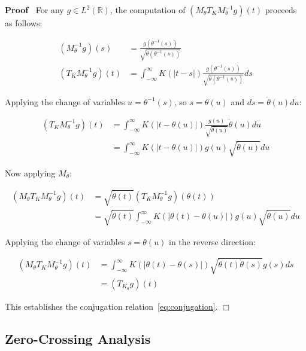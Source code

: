 \documentclass{article}
\newenvironment{proof}{\noindent\textbf{Proof\ }}{\hspace*{\fill}$\Box$\medskip}
\begin{document}
\begin{proof}
  For any $g \in L^2 (\mathbb{R})$, the computation of $(M_{\theta} T_K
  M_{\theta}^{- 1} g) (t)$ proceeds as follows:
  
  \begin{align}
    (M_{\theta}^{- 1} g) (s) & = \frac{g (\theta^{- 1}
    (s))}{\sqrt{\dot{\theta} (\theta^{- 1} (s))}} \\
    (T_K M_{\theta}^{- 1} g) (t) & = \int_{- \infty}^{\infty} K (|t - s|)
    \frac{g (\theta^{- 1} (s))}{\sqrt{\dot{\theta} (\theta^{- 1} (s))}} ds 
  \end{align}
  
  Applying the change of variables $u = \theta^{- 1} (s)$, so $s = \theta (u)$
  and $ds = \dot{\theta} (u) du$:
  
  \begin{align}
    (T_K M_{\theta}^{- 1} g) (t) & = \int_{- \infty}^{\infty} K (|t - \theta
    (u) |) \frac{g (u)}{\sqrt{\dot{\theta} (u)}}  \dot{\theta} (u) du \\
    & = \int_{- \infty}^{\infty} K (|t - \theta (u) |) g (u)
    \sqrt{\dot{\theta} (u)} du 
  \end{align}
  
  Now applying $M_{\theta}$:
  
  \begin{align}
    (M_{\theta} T_K M_{\theta}^{- 1} g) (t) & = \sqrt{\dot{\theta} (t)}  (T_K
    M_{\theta}^{- 1} g) (\theta (t)) \\
    & = \sqrt{\dot{\theta} (t)}  \int_{- \infty}^{\infty} K (| \theta (t) -
    \theta (u) |) g (u) \sqrt{\dot{\theta} (u)} du 
  \end{align}
  
  Applying the change of variables $s = \theta (u)$ in the reverse direction:
  
  \begin{align}
    (M_{\theta} T_K M_{\theta}^{- 1} g) (t) & = \int_{- \infty}^{\infty} K (|
    \theta (t) - \theta (s) |) \sqrt{\dot{\theta} (t)  \dot{\theta} (s)} g (s)
    ds \\
    & = (T_{K_{\theta}} g) (t) 
  \end{align}
  
  This establishes the conjugation relation~\eqref{eq:conjugation}.
\end{proof}

\subsection{Zero-Crossing Analysis}
\end{document}
